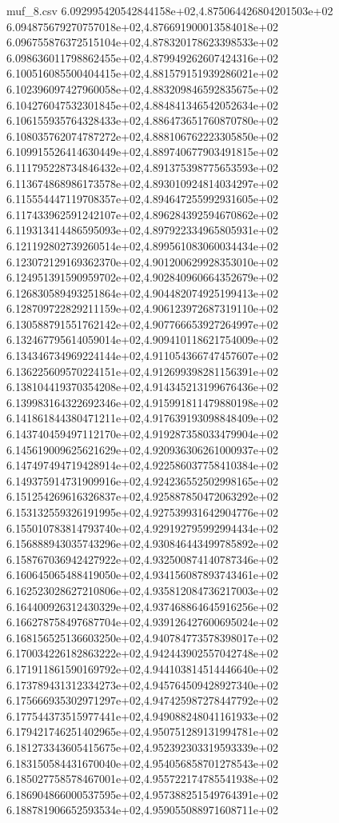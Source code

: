 \begin{filecontents*}{muf_8.csv}
6.092995420542844158e+02,4.875064426804201503e+02
6.094875679270757018e+02,4.876691900013584018e+02
6.096755876372515104e+02,4.878320178623398533e+02
6.098636011798862455e+02,4.879949262607424316e+02
6.100516085500404415e+02,4.881579151939286021e+02
6.102396097427960058e+02,4.883209846592835675e+02
6.104276047532301845e+02,4.884841346542052634e+02
6.106155935764328433e+02,4.886473651760870780e+02
6.108035762074787272e+02,4.888106762223305850e+02
6.109915526414630449e+02,4.889740677903491815e+02
6.111795228734846432e+02,4.891375398775653593e+02
6.113674868986173578e+02,4.893010924814034297e+02
6.115554447119708357e+02,4.894647255992931605e+02
6.117433962591242107e+02,4.896284392594670862e+02
6.119313414486595093e+02,4.897922334965805931e+02
6.121192802739260514e+02,4.899561083060034434e+02
6.123072129169362370e+02,4.901200629928353010e+02
6.124951391590959702e+02,4.902840960664352679e+02
6.126830589493251864e+02,4.904482074925199413e+02
6.128709722829211159e+02,4.906123972687319110e+02
6.130588791551762142e+02,4.907766653927264997e+02
6.132467795614059014e+02,4.909410118621754009e+02
6.134346734969224144e+02,4.911054366747457607e+02
6.136225609570224151e+02,4.912699398281156391e+02
6.138104419370354208e+02,4.914345213199676436e+02
6.139983164322692346e+02,4.915991811479880198e+02
6.141861844380471211e+02,4.917639193098848409e+02
6.143740459497112170e+02,4.919287358033479904e+02
6.145619009625621629e+02,4.920936306261000937e+02
6.147497494719428914e+02,4.922586037758410384e+02
6.149375914731909916e+02,4.924236552502998165e+02
6.151254269616326837e+02,4.925887850472063292e+02
6.153132559326191995e+02,4.927539931642904776e+02
6.155010783814793740e+02,4.929192795992994434e+02
6.156888943035743296e+02,4.930846443499785892e+02
6.158767036942427922e+02,4.932500874140787346e+02
6.160645065488419050e+02,4.934156087893743461e+02
6.162523028627210806e+02,4.935812084736217003e+02
6.164400926312430329e+02,4.937468864645916256e+02
6.166278758497687704e+02,4.939126427600695024e+02
6.168156525136603250e+02,4.940784773578398017e+02
6.170034226182863222e+02,4.942443902557042748e+02
6.171911861590169792e+02,4.944103814514446640e+02
6.173789431312334273e+02,4.945764509428927340e+02
6.175666935302971297e+02,4.947425987278447792e+02
6.177544373515977441e+02,4.949088248041161933e+02
6.179421746251402965e+02,4.950751289131994781e+02
6.181273343605415675e+02,4.952392303319593339e+02
6.183150584431670040e+02,4.954056858701278543e+02
6.185027758578467001e+02,4.955722174785541938e+02
6.186904866000537595e+02,4.957388251549764391e+02
6.188781906652593534e+02,4.959055088971608711e+02

\end{filecontents*}
